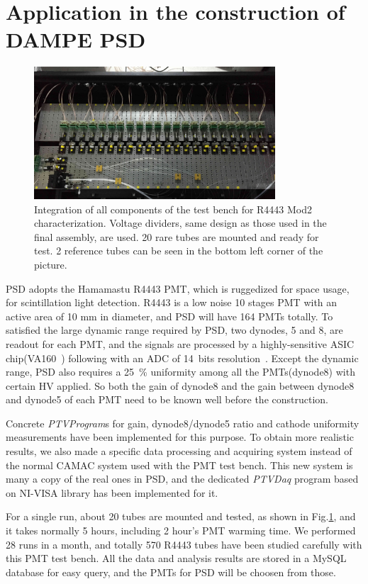 \documentclass[5p, times]{elsarticle}
\begin{document}
\section{Application in the construction of DAMPE PSD}
\label{sec:application}

\begin{figure}
 \centering
 \includegraphics[width=90mm]{integration3}
\caption{Integration of all components of the test bench for R4443 Mod2 characterization.
Voltage dividers, same design as those used in the final assembly, are used. 
20 rare tubes are mounted and ready for test.
2 reference tubes can be seen in the bottom left corner of the picture. 
}
\label{fig:integrated_testbench}
\end{figure}

PSD adopts the Hamamastu R4443 PMT, which is ruggedized for space usage, for scintillation light detection. 
R4443 is a low noise 10 stages PMT with an active area of 10 mm in diameter, and PSD will have 164 PMTs totally. 
To satisfied the large dynamic range required by PSD, two dynodes, 5 and 8, are readout for each PMT, and the
signals are processed by a highly-sensitive ASIC chip(VA160~\cite{va160}) following with an ADC of 14~bits resolution~\cite{fee}. Except the dynamic range, PSD also requires a \SI{25}{\percent} uniformity among all the PMTs(dynode8) with certain HV applied. So both the gain of dynode8 and the gain between dynode8 and dynode5 of each PMT need to be known well before the construction.

Concrete \textit{PTVProgram}s for gain, dynode8/dynode5 ratio and cathode uniformity measurements have been implemented for this purpose.
To obtain more realistic results, we also made a specific data processing and acquiring system instead of the normal CAMAC system used with the PMT test bench. This new system is many a copy of the real ones in PSD, and the dedicated \textit{PTVDaq} program based on NI-VISA library has been implemented for it.

For a single run, about 20 tubes are mounted and tested, as shown in Fig.\ref{fig:integrated_testbench}, and
it takes normally 5 hours, including 2 hour's PMT warming time. 
We performed 28 runs in a month, and totally 570 R4443 tubes have been studied carefully with this PMT test bench. All the data and analysis results are stored in a MySQL database for easy query, and the PMTs for PSD will be choosen from those.
\end{document}
